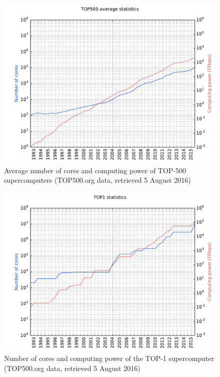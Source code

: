 \begin{figure}[t]
		\centerline 
{\includegraphics[scale=0.7]{img/cap1-top500-avg-comp}}
		\caption[TOP-500 supercomputers average performance]{Average number of cores and computing power of TOP-500
		supercomputers (TOP500.org data, retrieved 5 August 2016)}
		\label{fig:corestrend}
\end{figure}

\begin{figure}[t]
		\centerline 
{\includegraphics[scale=0.7]{img/cap1-top500-max-comp}}
		\caption[TOP-1 supercomputers performance]{Number of cores and computing power of the TOP-1
		supercomputer (TOP500.org data, retrieved 5 August 2016)}
		\label{fig:corestrend2}
\end{figure}



